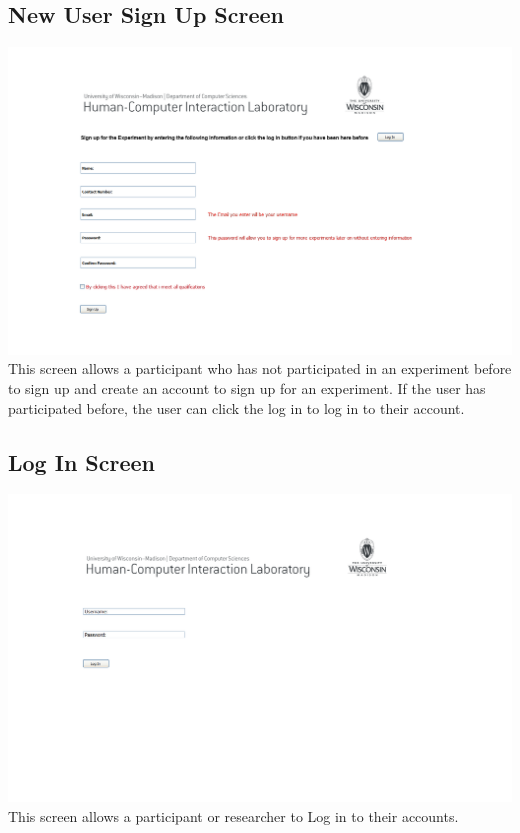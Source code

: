 \subsection{New User Sign Up Screen}
\includegraphics[width=6in]{../other/User_Interface/Milestone_3/new_user_signin.png}\\
This screen allows a participant who has not participated in an experiment before to sign up and create an account to sign up for an experiment.  If the user has participated before, the user can click the log in to log in to their account.

\subsection{Log In Screen}
\includegraphics[width=6in]{../other/User_Interface/Milestone_3/researchers_user_login.png}\\
This screen allows a participant or researcher to Log in to their accounts.

